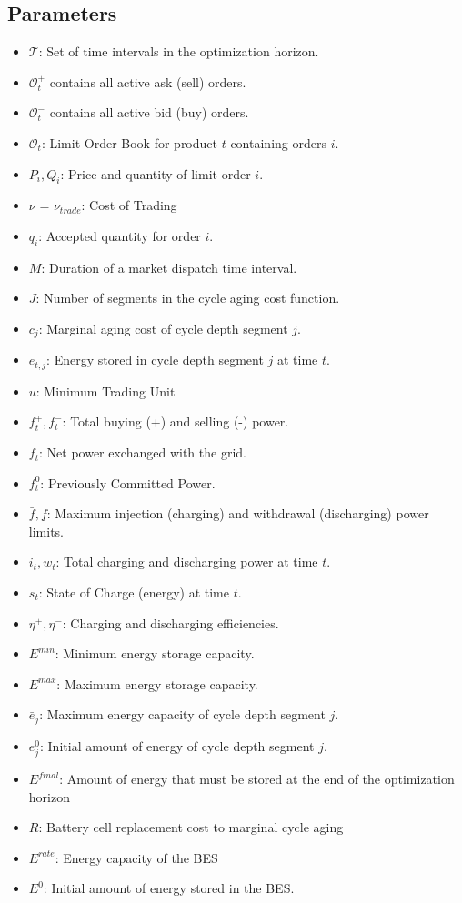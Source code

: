 \documentclass[10pt,twocolumn]{article}
\begin{document}
\subsection*{Parameters}
\begin{itemize}
    \item $\mathcal{T}$: Set of time intervals in the optimization horizon.
    \item $\mathcal{O}^+_t$ contains all active ask (sell) orders.
    \item $\mathcal{O}^-_t$ contains all active bid (buy) orders.
    \item $\mathcal{O}_t$: Limit Order Book for product $t$ containing orders $i$.
    \item $P_i, Q_i$: Price and quantity of limit order $i$.
    \item $\nu$ = $\nu_{trade}$: Cost of Trading
    \item $q_i$: Accepted quantity for order $i$.
    \item $M$: Duration of a market dispatch time interval.
    \item $J$: Number of segments in the cycle aging cost function.
    \item $c_j$: Marginal aging cost of cycle depth segment $j$.
    \item $e_{t,j}$: Energy stored in cycle depth segment $j$ at time $t$.
    \item $u$: Minimum Trading Unit 
    \item $f_t^{+},f_t^{-}$: Total buying (+) and selling (-) power.
    \item $f_{t}$: Net power exchanged with the grid.
    \item $f_{t}^{0}$: Previously Committed Power.
    \item $\bar{f}, \underline{f}$: Maximum injection (charging) and withdrawal (discharging) power limits.
    \item $i_t, w_t$: Total charging and discharging power at time $t$.
    \item $s_t$: State of Charge (energy) at time $t$.
    \item $\eta^+, \eta^-$: Charging and discharging efficiencies.
    \item $E^{min}$: Minimum energy storage capacity.
    \item $E^{max}$: Maximum energy storage capacity.
    \item $\bar{e}_j$: Maximum energy capacity of cycle depth segment $j$. 
    \item $e_j^{0}$: Initial amount of energy of cycle depth segment $j$.
    \item $E^{final}$: Amount of energy that must be stored at the end of the optimization horizon
    \item $R$: Battery cell replacement cost to marginal cycle aging 
    
    \item $E^{rate}$: Energy capacity of the BES
    \item $E^0$: Initial amount of energy stored in the BES.
    
\end{itemize}
\end{document}
